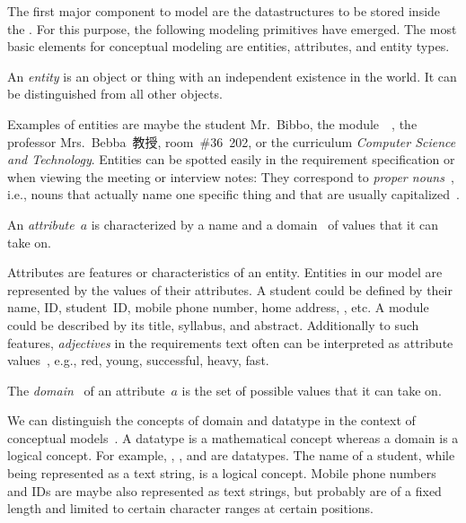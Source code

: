 %
%
\label{sec:entitisAttrsErd}%
%
The first major component to model are the datastructures to be stored inside the \db.
For this purpose, the following modeling primitives have emerged.
The most basic elements for conceptual modeling are entities, attributes, and entity types.%
%
\begin{definition}[Entity]%
\label{def:entity}%
An \emph{entity} is an object or thing with an independent existence in the world. %
It can be distinguished from all other objects.%
\end{definition}%
%
Examples of entities are maybe the student Mr.~Bibbo, the module~~\cite{programmingWithPython}, the professor Mrs.~Bebba~教授, room~\#36~202, or the curriculum \emph{Computer Science and Technology}.
Entities can be spotted easily in the requirement specification or when viewing the meeting or interview notes:
They correspond to \emph{proper nouns}~\cite{C1997ECAED}, i.e., nouns that actually name one specific thing and that are usually capitalized~\cite{EOWM2025MWAMTD:CAPNWTDLWOGC}.%
%
\begin{definition}[Attribute]%
\label{def:attribute}%
An \emph{attribute}~$a$ is characterized by a name and a domain~ of values that it can take on.%
\end{definition}%
%
Attributes are features or characteristics of an entity.
Entities in our model are represented by the values of their attributes.
A student could be defined by their name, ID, student~ID, mobile phone number, home address, , etc.
A module could be described by its title, syllabus, and abstract.
Additionally to such features, \emph{adjectives} in the requirements text often can be interpreted as attribute values~\cite{C1997ECAED}, e.g., red, young, successful, heavy, fast.%
%
\begin{definition}[Domain]%
\label{def:attributeDomain}%
The \emph{domain}~ of an attribute~$a$ is the set of possible values that it can take on.%
\end{definition}%
%
We can distinguish the concepts of domain and datatype in the context of conceptual models~\cite{S2024D:LDMRMRA}.
A datatype is a mathematical concept whereas a domain is a logical concept.
For example, , , and  are datatypes.
The name of a student, while being represented as a text string, is a logical concept.
Mobile phone numbers and IDs are maybe also represented as text strings, but probably are of a fixed length and limited to certain character ranges at certain positions.
